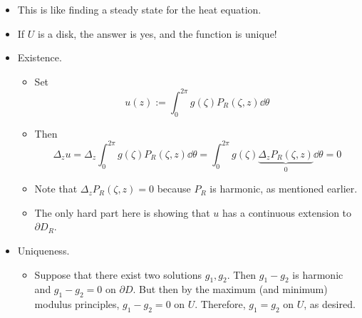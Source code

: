 \documentclass[../notes.tex]{subfiles}
\begin{document}
\begin{itemize}
\begin{itemize}
        \item This is like finding a steady state for the heat equation.
        \item If $U$ is a disk, the answer is yes, and the function is unique!
        \item Existence.
        \begin{itemize}
            \item Set
            \begin{equation*}
                u(z) := \int_0^{2\pi}g(\zeta)P_R(\zeta,z)\dd\theta
            \end{equation*}
            \item Then
            \begin{equation*}
                \Delta_zu = \Delta_z\int_0^{2\pi}g(\zeta)P_R(\zeta,z)\dd\theta
                = \int_0^{2\pi}g(\zeta)\underbrace{\Delta_zP_R(\zeta,z)}_0\dd\theta
                = 0
            \end{equation*}
            \item Note that $\Delta_zP_R(\zeta,z)=0$ because $P_R$ is harmonic, as mentioned earlier.
            \item The only hard part here is showing that $u$ has a continuous extension to $\partial D_R$.
        \end{itemize}
        \item Uniqueness.
        \begin{itemize}
            \item Suppose that there exist two solutions $g_1,g_2$. Then $g_1-g_2$ is harmonic and $g_1-g_2=0$ on $\partial D$. But then by the maximum (and minimum) modulus principles, $g_1-g_2=0$ on $U$. Therefore, $g_1=g_2$ on $U$, as desired.
        \end{itemize}
    \end{itemize}
\end{itemize}
\end{document}
